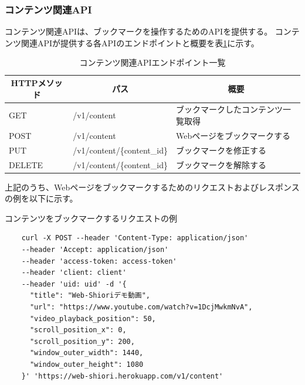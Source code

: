 \subsubsection{コンテンツ関連API}
コンテンツ関連APIは、ブックマークを操作するためのAPIを提供する。
コンテンツ関連APIが提供する各APIのエンドポイントと概要を表\ref{tb:design-content-api}に示す。

\begin{table}[htbp]
  \label{tb:design-content-api}
  \caption{コンテンツ関連APIエンドポイント一覧}
  \begin{center}
    \begin{tabular}{|l|l|l|}
      \hline
      \multicolumn{1}{|c|}{\textbf{HTTPメソッド}} & \multicolumn{1}{|c|}{\textbf{パス}} & \multicolumn{1}{|c|}{\textbf{概要}} \\\hline
      GET & /v1/content & ブックマークしたコンテンツ一覧取得 \\\hline
      POST & /v1/content & Webページをブックマークする \\\hline
      PUT & /v1/content/\{content\_id\} & ブックマークを修正する \\\hline
      DELETE & /v1/content/\{content\_id\} & ブックマークを解除する \\\hline
    \end{tabular}
  \end{center}
\end{table}

上記のうち、Webページをブックマークするためのリクエストおよびレスポンスの例を以下に示す。

\begin{itembox}[l]{コンテンツをブックマークするリクエストの例}
  \label{content-request-curl}
  \begin{verbatim}
    curl -X POST --header 'Content-Type: application/json' 
    --header 'Accept: application/json' 
    --header 'access-token: access-token' 
    --header 'client: client' 
    --header 'uid: uid' -d '{
      "title": "Web-Shioriデモ動画",
      "url": "https://www.youtube.com/watch?v=1DcjMwkmNvA",
      "video_playback_position": 50,
      "scroll_position_x": 0,
      "scroll_position_y": 200,
      "window_outer_width": 1440,
      "window_outer_height": 1080
    }' 'https://web-shiori.herokuapp.com/v1/content'
  \end{verbatim}
\end{itembox}

